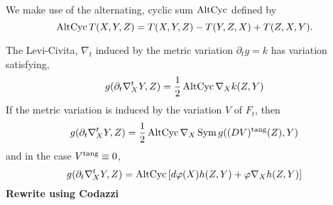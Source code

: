 We make use of the alternating, cyclic sum \(\operatorname{AltCyc}\) defined by
\[
\operatorname{AltCyc} T(X, Y, Z) = T(X, Y, Z) - T(Y, Z, X) + T(Z, X, Y).
\]

\begin{lemma}
\label{lem:dt_nabla}
The Levi-Civita, \(\nabla_t\) induced by the metric variation \(\partial_t g = k\) has variation satisfying,
\[
g(\partial_t \nabla^t_X Y, Z) = \frac{1}{2} \operatorname{AltCyc} \nabla_X k(Z, Y)
\]
If the metric variation is induced by the variation \(V\) of \(F_t\), then
\[
g(\partial_t \nabla^t_X Y, Z) = \frac{1}{2} \operatorname{AltCyc} \nabla_X \operatorname{Sym} g((DV)^{\operatorname{tang}} (Z), Y)
\]
and in the case \(V^{\operatorname{tang}} \equiv 0\),
\[
g(\partial_t \nabla^t_X Y, Z) = \operatorname{AltCyc} \left[d\varphi(X) h(Z, Y) + \varphi \nabla_X h (Z, Y)\right]
\]
\textbf{Rewrite using Codazzi}
\end{lemma}

